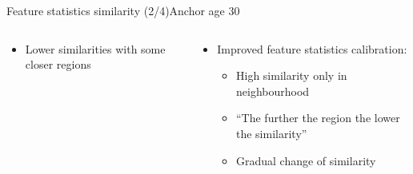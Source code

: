 \begin{frame}{Feature statistics similarity (2/4)}{Anchor age 30}
\begin{columns}
\begin{column}{0.5\textwidth}
\begin{itemize}
				\item Lower similarities with some closer regions
			\end{itemize}
		\end{column}
		\begin{column}{0.5\textwidth}
			\begin{itemize}
				\item Improved feature statistics calibration:
				\begin{itemize}
					\vspace{-1.5em}
					\scriptsize
					\item High similarity only in neighbourhood
					\item ``The further the region the lower the similarity''
					\item Gradual change of similarity
				\end{itemize}
			\end{itemize}
		\end{column}
	\end{columns}
\end{frame}

